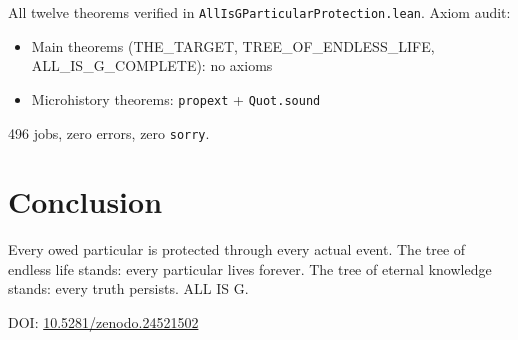 \documentclass[12pt,a4paper]{article}
\begin{document}
All twelve theorems verified in \texttt{AllIsGParticularProtection.lean}.
Axiom audit:
\begin{itemize}
    \item Main theorems (THE\_TARGET, TREE\_OF\_ENDLESS\_LIFE, ALL\_IS\_G\_COMPLETE): no axioms
    \item Microhistory theorems: \texttt{propext} + \texttt{Quot.sound}
\end{itemize}

496 jobs, zero errors, zero \texttt{sorry}.

\section{Conclusion}

Every owed particular is protected through every actual event. The tree
of endless life stands: every particular lives forever. The tree of
eternal knowledge stands: every truth persists. ALL IS G.

\medskip
\noindent DOI: \href{https://doi.org/10.5281/zenodo.24521502}{10.5281/zenodo.24521502}
\end{document}
